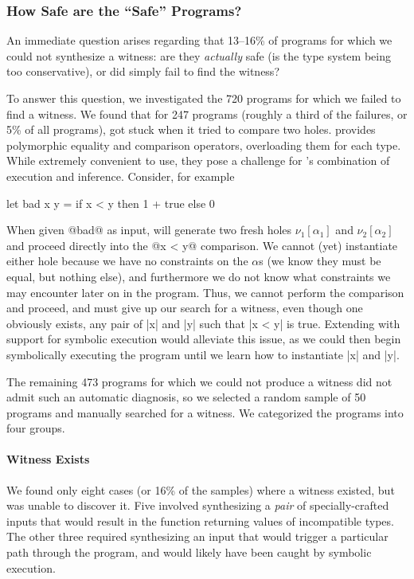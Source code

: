 \subsubsection{How Safe are the ``Safe'' Programs?}
\label{sec:how-safe}

An immediate question arises regarding that 13--16\% of programs for
which we could not synthesize a witness:
%
are they \emph{actually} safe (\ie is the type system being too conservative),
%
or did \toolname simply fail to find the witness?

To answer this question, we investigated the 720 \ucsdbench programs for
which we failed to find a witness.
%
We found that for 247 programs (roughly a third of the failures, or 5\%
of all programs), \toolname got stuck when it tried to compare two holes.
%
\ocaml provides polymorphic equality and comparison operators,
overloading them for each type.
%
While extremely convenient to use, they pose a challenge for \toolname's
combination of execution and inference.
%
Consider, for example
%
\begin{code}
  let bad x y =
    if x < y then
      1 + true
    else
      0
\end{code}
%
When given @bad@ as input, \toolname will generate two fresh holes
$\nu_1[\alpha_1]$ and $\nu_2[\alpha_2]$ and proceed directly into the
@x < y@ comparison.
%
We cannot (yet) instantiate either hole because we have no constraints
on the $\alpha$s (we know they must be equal, but nothing else), and
furthermore we do not know what constraints we may encounter later on in
the program.
%
Thus, we cannot perform the comparison and proceed, and must give up our
search for a witness, even though one obviously exists, any pair of |x|
and |y| such that |x < y| is true.
%
Extending \toolname with support for symbolic execution would alleviate
this issue, as we could then begin symbolically executing the program
until we learn how to instantiate |x| and |y|.

The remaining 473 programs for which we could not produce a witness did
not admit such an automatic diagnosis, so we selected a random sample of
50 programs and manually searched for a witness.
%
We categorized the programs into four groups.

\paragraph{Witness Exists}
%
We found only eight cases (or 16\% of the samples) where a witness existed,
but \toolname was unable to discover it.
%
Five involved synthesizing a \emph{pair} of specially-crafted inputs
that would result in the function returning values of incompatible
types.
%
The other three required synthesizing an input that would trigger a
particular path through the program, and would likely have been caught
by symbolic execution.
%
%

